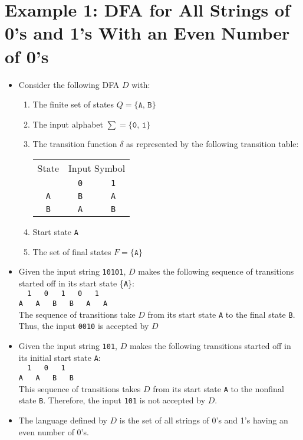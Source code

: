 \documentclass[]{article}
\begin{document}
\section{Example 1: DFA for All Strings of 0's and 1's With an Even Number of 
0's}
  \begin{itemize}
    \item Consider the following DFA $D$ with:
      \begin{enumerate}
        \item The finite set of states $Q = \{ \texttt{A, B} \}$
        \item The input alphabet $\sum = \{ \texttt{0, 1} \}$
        \item The transition function $\delta$ as represented by the following 
        transition table:
        
          \begin{tabular}{|c|c|c|}
            \hline
            State & \multicolumn{2}{|c|}{Input Symbol} \\ \cline{2-3}
                  & \texttt{0} & \texttt{1} \\ \hline
            \texttt{A} & \texttt{B} & \texttt{A} \\ \hline
            \texttt{B} & \texttt{A} & \texttt{B} \\ \hline
          \end{tabular}
        
        \item Start state \texttt{A}
        \item The set of final states $F = \{ \texttt{A} \}$
      \end{enumerate}
    \item Given the input string \texttt{10101}, $D$ makes the following 
    sequence of transitions started off in its start state \{\texttt{A}\}:\\
    \verb|  1   0   1   0   1  |\\
    \verb|A   A   B   B   A   A| \\
    The sequence of transitions take $D$ from its start state \texttt{A} to the 
    final state \texttt{B}. Thus, the input \texttt{0010} is accepted by $D$
    \item Given the input string \texttt{101}, $D$ makes the following 
    transitions started off in its initial start state \texttt{A}:\\
    \verb|  1   0   1  | \\
    \verb|A   A   B   B| \\
    This sequence of transitions takes $D$ from its start state \texttt{A} to 
    the nonfinal state \texttt{B}. Therefore, the input \texttt{101} is not 
    accepted by $D$.
    \item The language defined by $D$ is the set of all strings of 0's and 1's 
    having an even number of 0's.
  \end{itemize}
\end{document}

